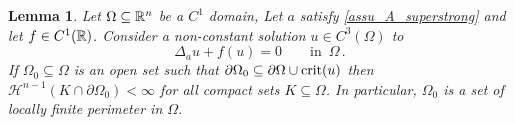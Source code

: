 \documentclass[10 pt,a4paper]{article}
\newtheorem{lemma}[definition]{Lemma}
\theoremstyle{definition}
\newtheorem{remark}[definition]{Remark}
\begin{document}
\begin{lemma} \label{Om_finper}
	Let $\Omega\subseteq\mathbb R^n$ be a $C^1$ domain, Let $a$ satisfy \eqref{assu_A_superstrong} and let $f \in C^1(\mathbb R)$. Consider a non-constant solution $u \in C^3(\Omega)$ to
	\[
	\Delta_a u + f(u) = 0 \qquad \text{in } \, \Omega \, .
	\]
	If $\Omega_0\subseteq\Omega$ is an open set such that $\partial\Omega_0 \subseteq \partial\Omega \cup {\rm crit}(u)$
	then $\mathscr{H}^{n-1}(K\cap\partial\Omega_0) < \infty$ for all compact sets $K\subseteq\Omega$. In particular, $\Omega_0$ is a set of locally finite perimeter in $\Omega$.
\end{lemma}

\end{document}
